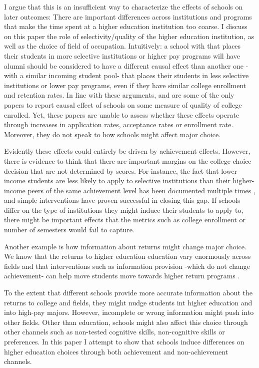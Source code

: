 \documentclass[a4paper, article, english, oneside, unknownkeysallowed, 12pt]{memoir}
\begin{document}
I argue that this is an insufficient way to characterize the effects of schools on later outcomes: There are important differences across institutions and programs that make the time spent at a higher education institution too coarse.
I discuss on this paper the role of selectivity/quality of the higher education institution, as well as the choice of field of occupation. Intuitively: a school with that places their students in more selective institutions or higher pay programs will have alumni should be considered to have a different causal effect than another one -with a similar incoming student pool- that places their students in less selective institutions or lower pay programs, even if they have similar college enrollment and retention rates. 
 In line with these arguments,  \parencite{abdulkadiroglu_elite_2014} and 
\parencite{abdulkadiroglu_parents_2020} are some of the only papers to report causal effect of schools on some measure of quality of college enrolled. Yet, these papers are unable to assess whether these effects operate through increases in application rates, acceptance rates or enrollment rate. Moreover, they do not speak to how schools might affect major choice. 

Evidently these effects could entirely be driven by achievement effects. 
However, there is evidence to think that there are important margins on the college choice decision that are not determined by scores.  
For instance, the fact that lower-income students are less likely to apply to selective institutions than their higher-income peers of the same achievement level has been documented multiple times  \parencite{dynarski_closing_2021} \parencite{chetty_diversifying_2025}, and simple interventions  \parencite{hoxby_what_2015} have proven successful in closing this gap.
 If schools differ on the type of institutions they might induce their students to apply to, there might be important effects that the metrics such as college enrollment or number of semesters would fail to capture. 


Another example is how information about returns might change major choice.
 We know that the returns to higher education education vary enormously across fields \parencite{kirkeboen_field_2016} and that interventions such as information provision -which do not change achievement- can help move students move towards higher return programs \parencite{hastings_informed_2016}. 

To the extent that different schools provide more accurate information about the returns to college and fields, they might nudge students int higher education and into high-pay majors.
 However, incomplete or wrong information might push into other fields. Other than education, schools might also affect this choice through other channels such as non-tested cognitive skills, non-cognitive skills or preferences.  
 In this paper I attempt to show that schools induce differences on higher education choices through both achievement and non-achievement channels.
\end{document}
